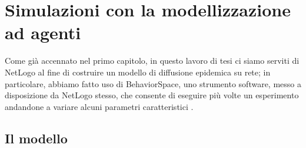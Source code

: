 \chapter{Simulazioni con la modellizzazione ad agenti}
\label{chap:cap4}
Come già accennato nel primo capitolo, in questo lavoro di tesi ci siamo serviti di NetLogo al fine di costruire un modello di diffusione epidemica su rete; in particolare, abbiamo fatto uso di BehaviorSpace, uno strumento software, messo a disposizione da NetLogo stesso, che consente di eseguire più volte un esperimento andandone a variare alcuni parametri caratteristici \cite{Wilensky2}. 
\section{Il modello}

